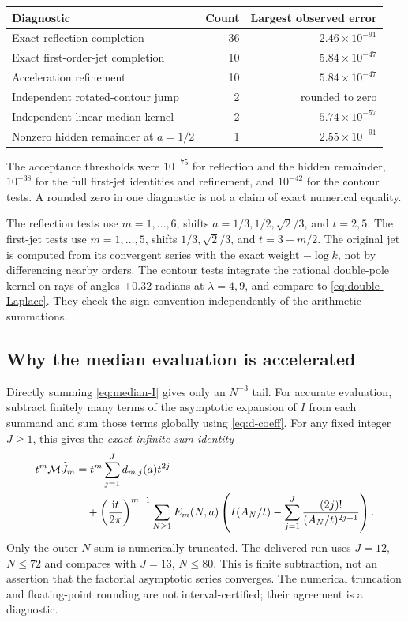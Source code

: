 \documentclass[11pt,a4paper]{article}
\numberwithin{equation}{section}
\theoremstyle{definition}\newtheorem{definition}[theorem]{Definition}
\theoremstyle{remark}\newtheorem{remark}[theorem]{Remark}
\newcommand{\ii}{\mathrm i}\newcommand{\e}{\mathrm e}
\begin{document}
\begin{center}
\small
\begin{tabular}{@{}p{75mm}rr@{}}
\toprule
Diagnostic & Count & Largest observed error\\
\midrule
Exact reflection completion & 36 & $2.46\times10^{-91}$\\
Exact first-order-jet completion & 10 & $5.84\times10^{-47}$\\
Acceleration refinement & 10 & $5.84\times10^{-47}$\\
Independent rotated-contour jump & 2 & rounded to zero\\
Independent linear-median kernel & 2 & $5.74\times10^{-57}$\\
Nonzero hidden remainder at $a=1/2$ & 1 & $2.55\times10^{-91}$\\
\bottomrule
\end{tabular}
\end{center}
The acceptance thresholds were $10^{-75}$ for reflection and the hidden
remainder, $10^{-38}$ for the full first-jet identities and refinement,
and $10^{-42}$ for the contour tests. A rounded zero in one diagnostic
is not a claim of exact numerical equality.

The reflection tests use $m=1,\ldots,6$, shifts
$a=1/3,1/2,\sqrt2/3$, and $t=2,5$. The first-jet tests use
$m=1,\ldots,5$, shifts $1/3,\sqrt2/3$, and $t=3+m/2$.
The original jet is computed from its convergent series with the exact
weight $-\log k$, not by differencing nearby orders.
The contour tests integrate the rational double-pole kernel on rays of
angles $\pm0.32$ radians at $\lambda=4,9$, and compare to
\eqref{eq:double-Laplace}. They check the sign convention independently
of the arithmetic summations.

\subsection{Why the median evaluation is accelerated}
Directly summing \eqref{eq:median-I} gives only an $N^{-3}$ tail.
For accurate evaluation, subtract finitely many terms of the asymptotic
expansion of $I$ from each summand and sum those terms globally using
\eqref{eq:d-coeff}. For any fixed integer $J\ge1$, this gives the
\emph{exact infinite-sum identity}
\begin{equation}
 \begin{split}
 t^m\Med\widetilde J_m
 &=t^m\sum_{j=1}^Jd_{m,j}(a)t^{2j}\\
 &\quad+\left(\frac{\ii t}{2\pi}\right)^{m-1}
 \sum_{N\ge1}E_m(N,a)
 \left(I(A_N/t)-\sum_{j=1}^J\frac{(2j)!}{(A_N/t)^{2j+1}}\right).
 \end{split}
 \label{eq:accelerated}
\end{equation}
Only the outer $N$-sum is numerically truncated. The delivered run uses
$J=12$, $N\le72$ and compares with $J=13$, $N\le80$.
This is finite subtraction, not an assertion that the factorial
asymptotic series converges. The numerical truncation and floating-point
rounding are not interval-certified; their agreement is a diagnostic.
\end{document}
